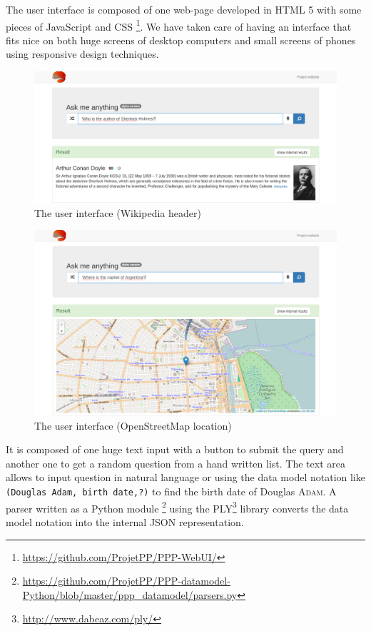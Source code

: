 The user interface is composed of one web-page developed in HTML 5 with some
pieces of JavaScript and CSS \footnote{\url{https://github.com/ProjetPP/PPP-WebUI/}}.
We have taken care of having an
interface that fits nice on both huge screens of desktop computers
and small screens of phones using responsive design techniques.

\begin{figure}[!ht]
    \centering
    \includegraphics[width=1\textwidth]{WebUI.png}
    \caption{The user interface (Wikipedia header)}
\end{figure}

\begin{figure}[!ht]
    \centering
    \includegraphics[width=1\textwidth]{WebUI2.png}
    \caption{The user interface (OpenStreetMap location)}
\end{figure}

It is composed of one huge text input with a button to submit
the query and another one to get a random question from a hand written list. The text area
allows to input question in natural language or using the data model notation like
\texttt{(Douglas Adam, birth date,?)} to find the
birth date of Douglas \textsc{Adam}. A parser written as a Python module
\footnote{\url{https://github.com/ProjetPP/PPP-datamodel-Python/blob/master/ppp\_datamodel/parsers.py}}
using
the PLY\footnote{\url{http://www.dabeaz.com/ply/}} library converts
the data model notation into the internal JSON representation.

